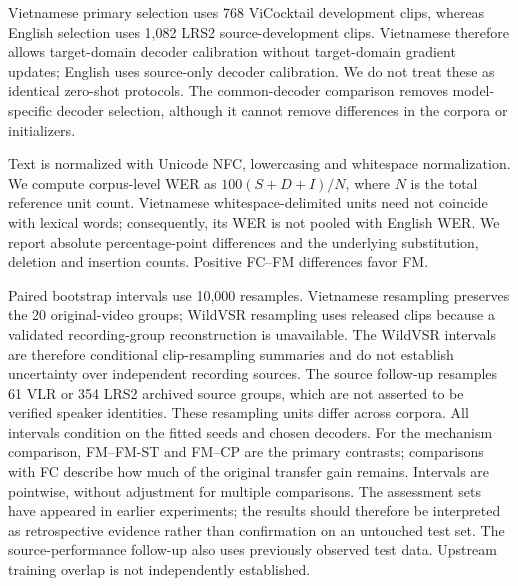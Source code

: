 Vietnamese primary selection uses 768 ViCocktail development clips, whereas
English selection uses 1,082 LRS2 source-development clips. Vietnamese therefore
allows target-domain decoder calibration without target-domain gradient updates;
English uses source-only decoder calibration. We do not treat these as identical
zero-shot protocols. The common-decoder comparison removes model-specific decoder
selection, although it cannot remove differences in the corpora or initializers.

Text is normalized with Unicode NFC, lowercasing and whitespace normalization.
We compute corpus-level WER as $100(S+D+I)/N$, where $N$ is the total reference
unit count. Vietnamese whitespace-delimited units need not coincide with lexical
words; consequently, its WER is not pooled with English WER. We report absolute
percentage-point differences and the underlying substitution, deletion and
insertion counts. Positive FC--FM differences favor FM.

Paired bootstrap intervals use 10,000 resamples. Vietnamese resampling preserves
the 20 original-video groups; WildVSR resampling uses released clips because a
validated recording-group reconstruction is unavailable. The WildVSR intervals are
therefore conditional clip-resampling summaries and do not establish uncertainty
over independent recording sources. The source follow-up resamples 61 VLR or
354 LRS2 archived source groups, which are not asserted to be verified speaker
identities. These resampling units differ across corpora. All intervals condition on the
fitted seeds and chosen decoders. For the mechanism comparison, FM--FM-ST and
FM--CP are the primary contrasts; comparisons with FC describe how much of the
original transfer gain remains. Intervals are pointwise, without adjustment for
multiple comparisons. The assessment sets have appeared in earlier
experiments; the results should therefore be interpreted as retrospective
evidence rather than confirmation on an untouched test set. The source-performance follow-up also uses previously observed test data.
Upstream training overlap is not independently established.
